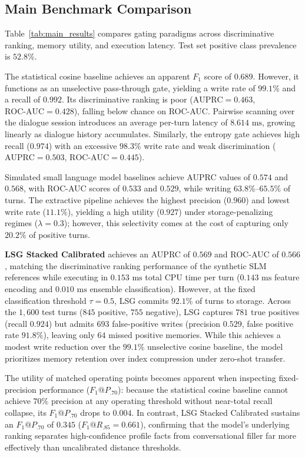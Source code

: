 \documentclass[journal]{IEEEtran}
\begin{document}
\subsection{Main Benchmark Comparison}
Table~\ref{tab:main_results} compares gating paradigms across discriminative ranking, memory utility, and execution latency. Test set positive class prevalence is $52.8\%$.

The statistical cosine baseline achieves an apparent $F_1$ score of $0.689$. However, it functions as an unselective pass-through gate, yielding a write rate of $99.1\%$ and a recall of $0.992$. Its discriminative ranking is poor ($\text{AUPRC} = 0.463$, $\text{ROC-AUC} = 0.428$), falling below chance on ROC-AUC. Pairwise scanning over the dialogue session introduces an average per-turn latency of $8.614\text{ ms}$, growing linearly as dialogue history accumulates. Similarly, the entropy gate achieves high recall ($0.974$) with an excessive $98.3\%$ write rate and weak discrimination ($\text{AUPRC} = 0.503$, $\text{ROC-AUC} = 0.445$).

Simulated small language model baselines achieve AUPRC values of $0.574$ and $0.568$, with ROC-AUC scores of $0.533$ and $0.529$, while writing $63.8\%\text{--}65.5\%$ of turns. The extractive pipeline achieves the highest precision ($0.960$) and lowest write rate ($11.1\%$), yielding a high utility ($0.927$) under storage-penalizing regimes ($\lambda=0.3$); however, this selectivity comes at the cost of capturing only $20.2\%$ of positive turns.

\textbf{LSG Stacked Calibrated} achieves an AUPRC of $0.569$ and ROC-AUC of $0.566$, matching the discriminative ranking performance of the synthetic SLM references while executing in $0.153\text{ ms}$ total CPU time per turn ($0.143\text{ ms}$ feature encoding and $0.010\text{ ms}$ ensemble classification). However, at the fixed classification threshold $\tau = 0.5$, LSG commits $92.1\%$ of turns to storage. Across the $1,600$ test turns ($845$ positive, $755$ negative), LSG captures $781$ true positives (recall $0.924$) but admits $693$ false-positive writes (precision $0.529$, false positive rate $91.8\%$), leaving only $64$ missed positive memories. While this achieves a modest write reduction over the $99.1\%$ unselective cosine baseline, the model prioritizes memory retention over index compression under zero-shot transfer.

The utility of matched operating points becomes apparent when inspecting fixed-precision performance ($F_1@P_{.70}$): because the statistical cosine baseline cannot achieve $70\%$ precision at any operating threshold without near-total recall collapse, its $F_1@P_{.70}$ drops to $0.004$. In contrast, LSG Stacked Calibrated sustains an $F_1@P_{.70}$ of $0.345$ ($F_1@R_{.85} = 0.661$), confirming that the model's underlying ranking separates high-confidence profile facts from conversational filler far more effectively than uncalibrated distance thresholds.
\end{document}
